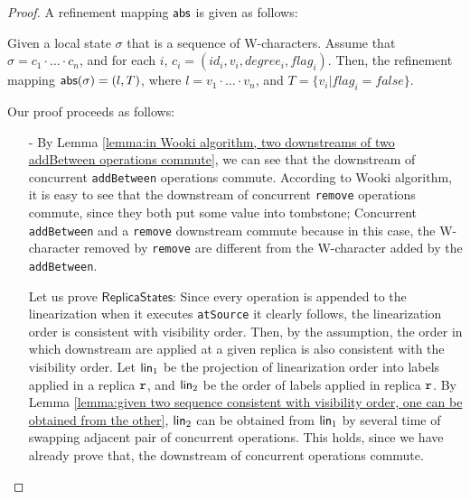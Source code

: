 \begin {proof}

A refinement mapping $\mathsf{abs}$ is given as follows:

Given a local state $\sigma$ that is a sequence of W-characters. Assume that $\sigma = c_1 \cdot \ldots \cdot c_n$, and for each $i$, $c_i = (id_i,v_i,degree_i,flag_i)$. Then, the refinement mapping $\mathsf{abs}(\sigma) = (l,T)$, where $l = v_1 \cdot \ldots \cdot v_n$, and $T = \{ v_i \vert flag_i = \mathit{false} \}$.

Our proof proceeds as follows:

\begin{itemize}
\setlength{\itemsep}{0.5pt}
\item[-] By Lemma \ref{lemma:in Wooki algorithm, two downstreams of two addBetween operations commute}, we can see that the downstream of concurrent {\tt addBetween} operations commute. According to Wooki algorithm, it is easy to see that the downstream of concurrent {\tt remove} operations commute, since they both put some value into tombstone; Concurrent {\tt addBetween} and a {\tt remove} downstream commute because in this case, the W-character removed by {\tt remove} are different from the W-character added by the {\tt addBetween}.

    Let us prove $\mathsf{ReplicaStates}$: Since every operation is appended to the linearization when it executes {\tt atSource} it clearly follows, the linearization order is consistent with visibility order. Then, by the {} assumption, the order in which downstream are applied at a given replica is also consistent with the visibility order. Let $\mathsf{lin}_1$ be the projection of linearization order into labels applied in a replica $\mathtt{r}$, and $\mathsf{lin}_2$ be the order of labels applied in replica $\mathtt{r}$. By Lemma \ref{lemma:given two sequence consistent with visibility order, one can be obtained from the other}, $\mathsf{lin}_2$ can be obtained from $\mathsf{lin}_1$ by several time of swapping adjacent pair of concurrent operations. This holds, since we have already prove that, the downstream of concurrent operations commute.


\end{itemize}
\end{proof}
